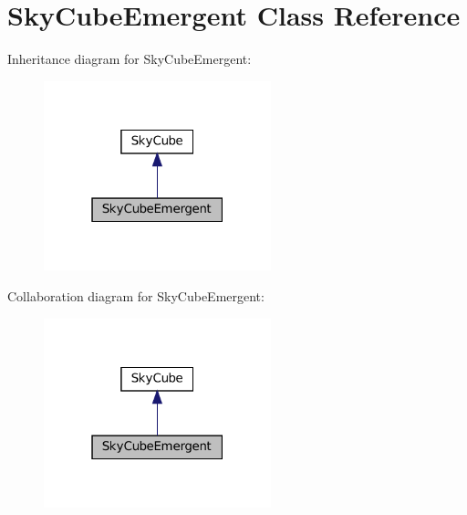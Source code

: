 \hypertarget{class_sky_cube_emergent}{}\section{Sky\+Cube\+Emergent Class Reference}
\label{class_sky_cube_emergent}


Inheritance diagram for Sky\+Cube\+Emergent\+:\nopagebreak
\begin{figure}[H]
\begin{center}
\leavevmode
\includegraphics[width=187pt]{class_sky_cube_emergent__inherit__graph}
\end{center}
\end{figure}


Collaboration diagram for Sky\+Cube\+Emergent\+:\nopagebreak
\begin{figure}[H]
\begin{center}
\leavevmode
\includegraphics[width=187pt]{class_sky_cube_emergent__coll__graph}
\end{center}
\end{figure}

